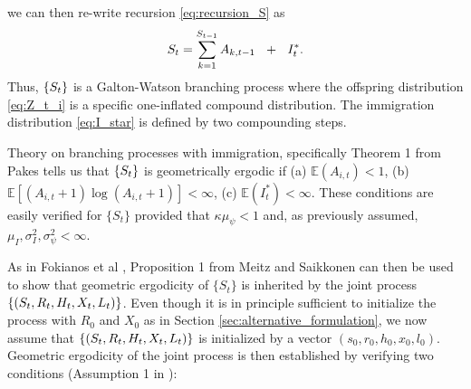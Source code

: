 \documentclass[review]{elsarticle}
\begin{document}
we can then re-write recursion \eqref{eq:recursion_S} as
$$
S_t = \sum_{k = 1}^{S_{t - 1}} A_{k, t - 1} \ \ + \ \ I^*_t.
$$
Thus, $\{S_t\}$ is a Galton-Watson branching process where the offspring distribution \eqref{eq:Z_t_i} is a specific one-inflated compound distribution. %
The immigration distribution \eqref{eq:I_star} is defined by two compounding steps. %

Theory on branching processes with immigration, specifically Theorem 1 from Pakes \cite{Pakes1971} tells us that $\{S_t\}$ is geometrically ergodic if (a) $\mathbb{E}(A_{i, t}) < 1$, (b) $\mathbb{E}[(A_{i, t} + 1)\log(A_{i, t} + 1)] < \infty$, (c) $\mathbb{E}(I^*_t) < \infty$. These conditions are easily verified for $\{S_t\}$ provided that $\kappa\mu_\psi < 1$ and, as previously assumed, $\mu_I, \sigma^2_I, \sigma^2_\psi < \infty$.


As in Fokianos et al \cite{Fokianos2009}, Proposition 1 from Meitz and Saikkonen \cite{Meitz2008} can then be used to show that geometric ergodicity of $\{S_t\}$ is inherited by the joint process $\{(S_t, R_t, H_t, X_t, L_t)\}$. %
Even though it is in principle sufficient to initialize the process with $R_0$ and $X_0$ as in Section \ref{sec:alternative_formulation}, we now assume that $\{(S_t, R_t, H_t, X_t, L_t)\}$ is initialized by a vector $(s_0, r_0, h_0, x_0, l_0)$. Geometric ergodicity of the joint process is then established by verifying two conditions (Assumption 1 in \cite{Meitz2008}):
\end{document}
